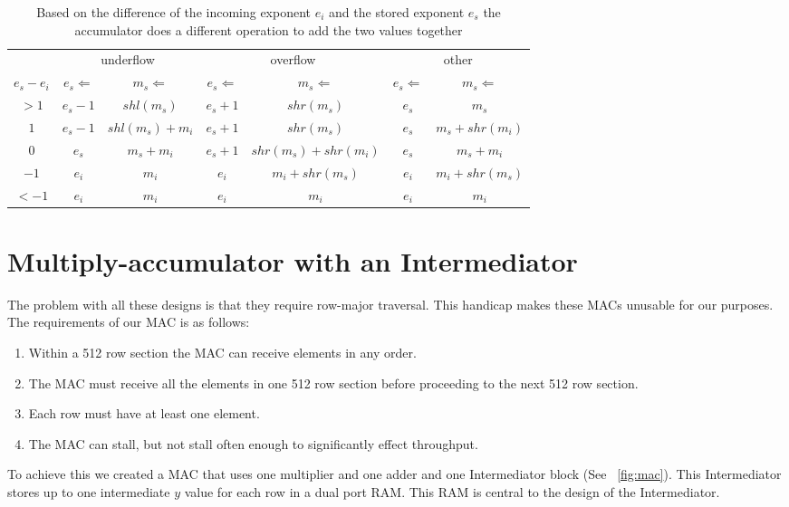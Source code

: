 \begin{table}
    \caption[How the stored value is updated in a in-order accumulator based on the stored value and incomming value.]{Based on the difference of the incoming exponent $e_i$ and the stored exponent $e_s$ the accumulator does a different operation to add the two values together}
    \label{tbl:accumulator_ops}
    \begin{tabular}{c|cc|cc|cc}
        & \multicolumn{2}{c|}{underflow} & \multicolumn{2}{c|}{overflow} & \multicolumn{2}{c}{other} \\
        $e_s - e_i$ & $e_s\Leftarrow$ & $m_s\Leftarrow$ & $e_s\Leftarrow$ & $m_s\Leftarrow$ & $e_s\Leftarrow$ & $m_s\Leftarrow$ \\
        \hline
        $>1$ & $e_s - 1$ & $shl(m_s)$ & $e_s + 1$ & $shr(m_s)$ & $e_s$ & $m_s$ \\
        $1$ & $e_s - 1$ & $shl(m_s) + m_i$ & $e_s + 1$ & $shr(m_s)$ & $e_s$ & $m_s + shr(m_i)$ \\
        $0$ & $e_s$ & $m_s + m_i$ & $e_s + 1$ & $shr(m_s) + shr(m_i)$ & $e_s$ & $m_s + m_i$ \\
        $-1$ & $e_i$ & $m_i$ & $e_i$ & $m_i + shr(m_s)$ & $e_i$ & $m_i + shr(m_s)$\\
        $<-1$ & $e_i$ & $m_i$ & $e_i$ & $m_i$ & $e_i$ & $m_i$ \\
    \end{tabular}
\end{table}

\section{Multiply-accumulator with an Intermediator}
\label{sec:intermediator}
The problem with all these designs is that they require row-major traversal. This handicap makes these MACs unusable for our purposes. The requirements of our MAC is as follows:
\begin{enumerate}
    \item Within a 512 row section the MAC can receive elements in any order.
    \item The MAC must receive all the elements in one 512 row section before proceeding to the next 512 row section.
    \item Each row must have at least one element.
    \item The MAC can stall, but not stall often enough to significantly effect throughput.

\end{enumerate}
To achieve this we created a MAC that uses one multiplier and one adder and one Intermediator block (See \figurename~\ref{fig:mac}). This Intermediator stores up to one intermediate $y$ value for each row in a dual port RAM. This RAM is central to the design of the Intermediator.

